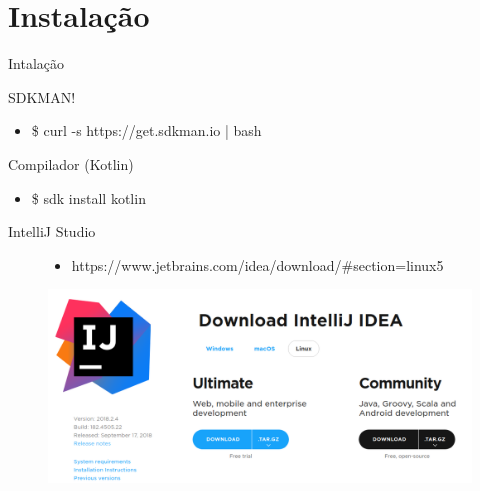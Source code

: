 \documentclass{beamer}
\begin{document}
\section{Instalação}
\begin{frame}{Intalação}


	\begin{block}{SDKMAN!}
		\begin{itemize}
			\item \$ curl -s https://get.sdkman.io | bash
		\end{itemize}
	\end{block}

	\begin{block}{Compilador (Kotlin)}
		\begin{itemize}
			 	\item \$ sdk install kotlin
		\end{itemize}
	\end{block}
	
	
	\begin{block}{IntelliJ Studio}
		\begin{figure}[!htb]
			\begin{itemize}
				\item https://www.jetbrains.com/idea/download/#section=linux5
			\end{itemize}
			
			\centering
			\includegraphics[scale=.15]{intellij.png}
		\end{figure}
		
		
		
	\end{block}
	

\end{frame}
\end{document}
